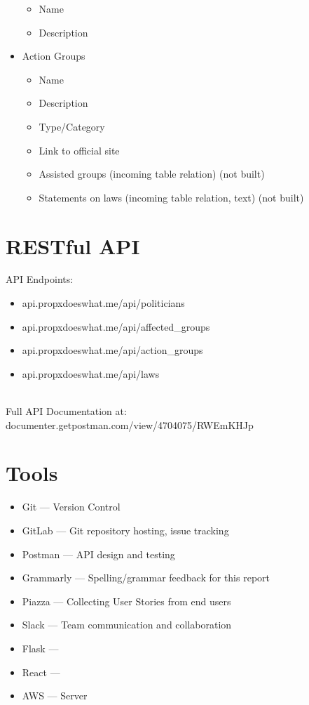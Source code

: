 \documentclass[12pt]{article}
\begin{document}
\begin{itemize}
\begin{itemize}
		\item Name
		\item Description
	\end{itemize}
	\item[] Action Groups
	\begin{itemize}
		\item Name
		\item Description
		\item Type/Category
		\item Link to official site
		\item Assisted groups (incoming table relation) (not built)
		\item Statements on laws (incoming table relation, text) (not built)
	\end{itemize}
\end{itemize}

\section{RESTful API}

API Endpoints: \\

\begin{itemize}
	\item api.propxdoeswhat.me/api/politicians
	\item api.propxdoeswhat.me/api/affected\_groups
	\item api.propxdoeswhat.me/api/action\_groups
	\item api.propxdoeswhat.me/api/laws
\end{itemize}

~\\
Full API Documentation at: documenter.getpostman.com/view/4704075/RWEmKHJp

\section{Tools}

\begin{itemize}
	\item Git		--- Version Control
	\item GitLab	--- Git repository hosting, issue tracking
	\item Postman	--- API design and testing %
	\item Grammarly	--- Spelling/grammar feedback for this report
	\item Piazza	--- Collecting User Stories from end users
	\item Slack		--- Team communication and collaboration
	\item Flask     --- 
	\item React     ---
	\item AWS       --- Server
\end{itemize}
\end{document}
